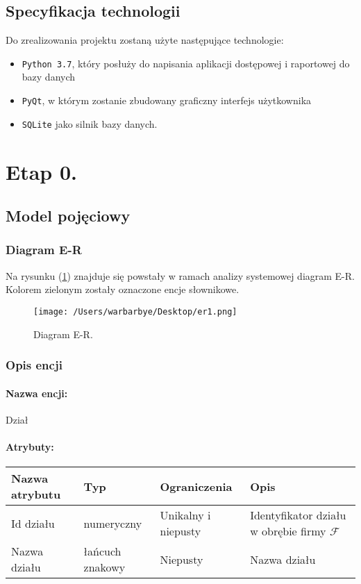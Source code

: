 \documentclass{article}
\begin{document}
\subsection{Specyfikacja technologii}
	Do zrealizowania projektu zostaną użyte następujące technologie:
		\begin{itemize}
			\item \texttt{Python 3.7}, który posłuży do napisania aplikacji dostępowej i raportowej do bazy danych
			\item \texttt{PyQt}, w którym zostanie zbudowany graficzny interfejs użytkownika
			\item \texttt{SQLite} jako silnik bazy danych.
		\end{itemize}
\newpage
\section{Etap 0. \label{s0}}
\subsection{Model pojęciowy}
\subsubsection{Diagram E-R}
Na rysunku (\ref{er1}) znajduje się powstały w ramach analizy systemowej diagram E-R. Kolorem zielonym zostały oznaczone encje słownikowe.
\begin{figure}[H]
			\centering
			\texttt{[image: /Users/warbarbye/Desktop/er1.png]}
			\label{er1}
			\caption{Diagram E-R.}
\end{figure}
\subsubsection{Opis encji}
\paragraph{Nazwa encji:\\ }
Dział
\paragraph{Atrybuty:\\ }
\begin{table}[H]
\begin{tabular}{|l|l|l|l|}
\hline
\textbf{Nazwa atrybutu} & \textbf{Typ}    & \textbf{Ograniczenia} & \textbf{Opis}                                      \\ \hline
Id działu               & numeryczny      & Unikalny i niepusty   & Identyfikator działu w obrębie firmy $\mathcal{F}$ \\ \hline
Nazwa działu            & łańcuch znakowy & Niepusty              & Nazwa działu                                       \\ \hline
\end{tabular}
\end{table}
\end{document}
